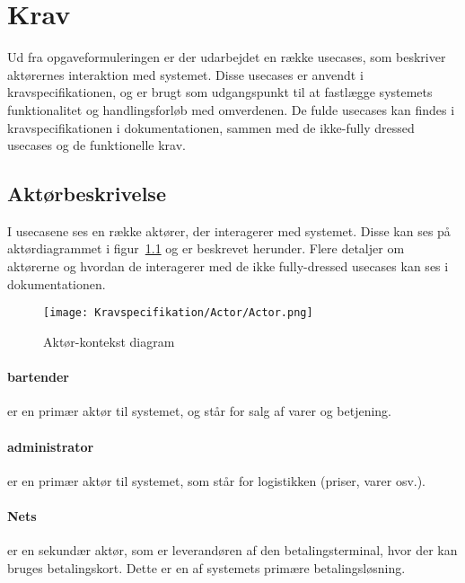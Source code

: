 \chapter{Krav}
Ud fra opgaveformuleringen er der udarbejdet en række \gls{usecase}s, som beskriver aktørernes interaktion med systemet. Disse \gls{usecase}s er anvendt i kravspecifikationen, og er brugt som udgangspunkt til at fastlægge systemets funktionalitet og handlingsforløb med omverdenen. De fulde \gls{usecase}s kan findes i kravspecifikationen i dokumentationen, sammen med de ikke-fully dressed \gls{usecase}s og de funktionelle krav.
\newline

\begin{minipage}{0.45\textwidth}
\raggedright
\section{Aktørbeskrivelse}
I \gls{usecase}ne ses en række aktører, der interagerer med systemet. Disse kan ses på aktørdiagrammet i figur~\ref{fig:actordiagram} og er beskrevet herunder. Flere detaljer om aktørerne og hvordan de interagerer med de ikke fully-dressed \gls{usecase}s kan ses i dokumentationen. 
\newline
\newline
\end{minipage}
\begin{minipage}{0.55\textwidth}
\begin{figure}[H]
	\centering
	\texttt{[image: Kravspecifikation/Actor/Actor.png]}
	\caption{Aktør-kontekst diagram}
	\label{fig:actordiagram}
\end{figure}
\end{minipage} \hfill
\newline
\subsubsection*{\Gls{bartender}}
er en primær aktør til systemet, og står for salg af varer og betjening. 

\subsubsection*{\Gls{administrator}}
er en primær aktør til systemet, som står for logistikken (priser, varer osv.). 

\subsubsection*{Nets}
er en sekundær aktør, som er leverandøren af den \gls{betalingsterminal}, hvor der kan bruges \gls{betalingskort}. Dette er en af systemets primære betalingsløsning.

